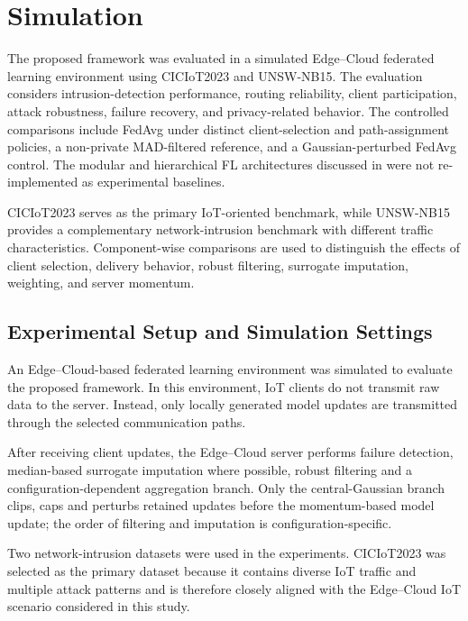 \documentclass[5p,times,numafflabel]{elsarticle}
\begin{document}
	\section{Simulation}
	\label{sec:experiments}
	
	The proposed framework was evaluated in a simulated Edge--Cloud
	federated learning environment using CICIoT2023 and UNSW-NB15.
	The evaluation considers intrusion-detection performance, routing
	reliability, client participation, attack robustness, failure
	recovery, and privacy-related behavior. The controlled comparisons include FedAvg under distinct
	client-selection and path-assignment policies, a non-private
	MAD-filtered reference, and a Gaussian-perturbed FedAvg control.
	The modular and hierarchical FL architectures discussed in
	\cite{almeida2025modular,chen2025hierarchical} were not
	re-implemented as experimental baselines.
	
	CICIoT2023 serves as the primary IoT-oriented benchmark, while
	UNSW-NB15 provides a complementary network-intrusion benchmark
	with different traffic characteristics. Component-wise comparisons
	are used to distinguish the effects of client selection, delivery
	behavior, robust filtering, surrogate imputation, weighting, and
	server momentum.
	
	\subsection{Experimental Setup and Simulation Settings}
	\label{subsec:experimental-setup}
	
	An Edge--Cloud-based federated learning environment was simulated to
	evaluate the proposed framework. In this environment, IoT clients do
	not transmit raw data to the server. Instead, only locally generated
	model updates are transmitted through the selected communication
	paths.
	

After receiving client updates, the Edge--Cloud server performs
failure detection, median-based surrogate imputation where possible,
robust filtering and a configuration-dependent aggregation branch.
Only the central-Gaussian branch clips, caps and perturbs retained
updates before the momentum-based model
update; the order of filtering and imputation is configuration-specific.
	
	Two network-intrusion datasets were used in the experiments.
	CICIoT2023 was selected as the primary dataset because it contains
	diverse IoT traffic and multiple attack patterns and is therefore
	closely aligned with the Edge--Cloud IoT scenario considered in this
	study.
	
\end{document}

